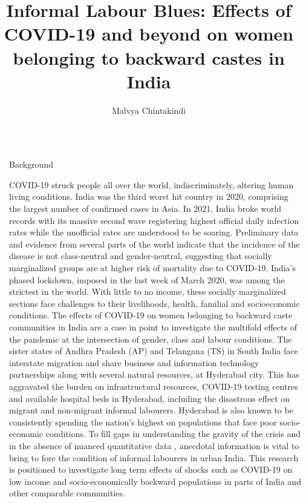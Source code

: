 \documentclass[final]{beamer}
\title{Informal Labour Blues: Effects of COVID-19 and beyond on women belonging to backward castes in India}
\author{Malvya Chintakindi\inst{1} \inst{*}}
\institute[shortinst]{\inst{1} PhD Student \samelineand \inst{*} Advised by: Dr. Lamia Karim}
\newlength{\sepwidth}
\newlength{\colwidth}
\newcommand{\separatorcolumn}{\begin{column}{\sepwidth}\end{column}}
\begin{document}
\begin{frame}[t]
\begin{columns}[t]
\separatorcolumn

\begin{column}{\colwidth}

  \begin{block}{Background}

COVID-19 struck people all over the world, indiscriminately,
altering human living conditions. India was the third worst hit
country in 2020, comprising the largest number of confirmed
cases in Asia. In 2021, India broke world records with its
massive second wave registering highest official daily
infection rates while the unofficial rates are understood to be
soaring. Preliminary data and evidence from several parts of
the world indicate that the incidence of the disease is not
class-neutral and gender-neutral, suggesting that socially
marginalized groups are at higher risk of mortality due to
COVID-19. India’s phased lockdown, imposed in the last week
of March 2020, was among the strictest in the world. With
little to no income, these socially marginalized sections face
challenges to their livelihoods, health, familial and socioeconomic
conditions. The effects of COVID-19 on women
belonging to backward caste communities in India are a case
in point to investigate the multifold effects of the pandemic at
the intersection of gender, class and labour conditions. The
sister states of Andhra Pradesh (AP) and Telangana (TS) in
South India face interstate migration and share business and
information technology partnerships along with several
natural resources, at Hyderabad city. This has aggravated the
burden on infrastructural resources, COVID-19 testing centres
and available hospital beds in Hyderabad, including the
disastrous effect on migrant and non-migrant informal
labourers. Hyderabad is also known to be consistently
spending the nation’s highest on populations that face poor
socio-economic conditions. To fill gaps in understanding the
gravity of the crisis and in the absence of nuanced quantitative
data , anecdotal information is vital to bring to fore the
condition of informal labourers in urban India. This research is
positioned to investigate long term effects of shocks such as
COVID-19 on low income and socio-economically backward
populations in parts of India and other comparable
communities.

\vspace{1cm}


\end{block}
\end{column}
\end{columns}
\end{frame}
\end{document}
